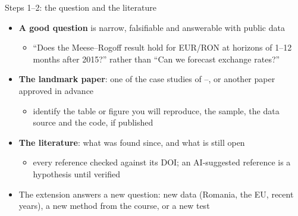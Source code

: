 \begin{frame}{Steps 1--2: the question and the literature}
\itemsize{\small}
\begin{itemize}
    \item \textbf{A good question} is narrow, falsifiable and answerable with public data
    \begin{itemize}
        \item ``Does the Meese--Rogoff result hold for EUR/RON at horizons of 1--12 months after 2015?'' rather than ``Can we forecast exchange rates?''
    \end{itemize}
    \item \textbf{The landmark paper}: one of the case studies of --, or another paper approved in advance
    \begin{itemize}
        \item identify the table or figure you will reproduce, the sample, the data source and the code, if published
    \end{itemize}
    \item \textbf{The literature}: what was found since, and what is still open
    \begin{itemize}
        \item every reference checked against its DOI; an AI-suggested reference is a hypothesis until verified 
    \end{itemize}
    \item The extension answers a new question: new data (Romania, the EU, recent years), a new method from the course, or a new test
\end{itemize}
\end{frame}

